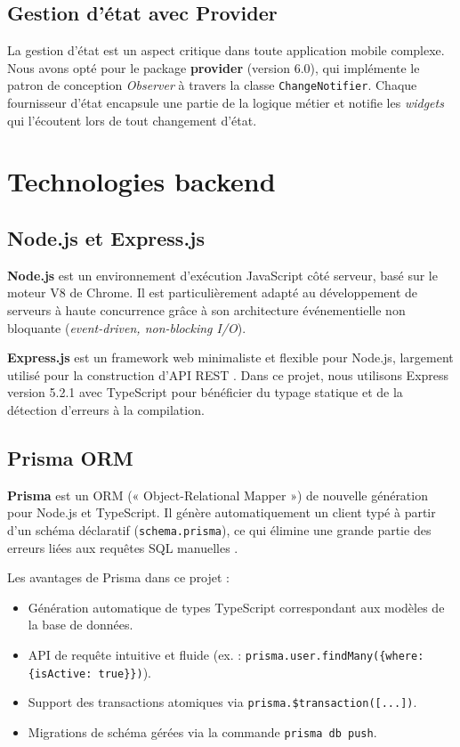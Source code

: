 \subsection{Gestion d'état avec Provider}

La gestion d'état est un aspect critique dans toute application mobile complexe. Nous avons opté pour le package \textbf{provider} (version 6.0), qui implémente le patron de conception \textit{Observer} à travers la classe \texttt{ChangeNotifier}. Chaque fournisseur d'état encapsule une partie de la logique métier et notifie les \textit{widgets} qui l'écoutent lors de tout changement d'état.

\section{Technologies backend}

\subsection{Node.js et Express.js}

\textbf{Node.js} est un environnement d'exécution JavaScript côté serveur, basé sur le moteur V8 de Chrome. Il est particulièrement adapté au développement de serveurs à haute concurrence grâce à son architecture événementielle non bloquante (\textit{event-driven, non-blocking I/O}).

\textbf{Express.js} est un framework web minimaliste et flexible pour Node.js, largement utilisé pour la construction d'API REST \cite{nodejs_express}. Dans ce projet, nous utilisons Express version 5.2.1 avec TypeScript pour bénéficier du typage statique et de la détection d'erreurs à la compilation.

\subsection{Prisma ORM}

\textbf{Prisma} est un ORM (« Object-Relational Mapper ») de nouvelle génération pour Node.js et TypeScript. Il génère automatiquement un client typé à partir d'un schéma déclaratif (\texttt{schema.prisma}), ce qui élimine une grande partie des erreurs liées aux requêtes SQL manuelles \cite{prisma_docs}.

Les avantages de Prisma dans ce projet :
\begin{itemize}
    \item Génération automatique de types TypeScript correspondant aux modèles de la base de données.
    \item API de requête intuitive et fluide (ex. : \texttt{prisma.user.findMany(\{where: \{isActive: true\}\})}).
    \item Support des transactions atomiques via \texttt{prisma.\$transaction([...])}.
    \item Migrations de schéma gérées via la commande \texttt{prisma db push}.
\end{itemize}

